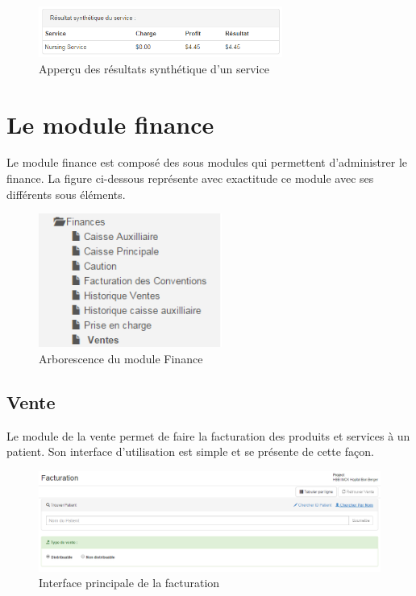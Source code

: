 \documentclass[12pt,a4paper]{report}
\begin{document}
\begin{figure}[h]
\begin{center}
\includegraphics[width=8cm]{pic/SynthetiqueService.png}
\end{center}
\caption{Apperçu des résultats synthétique d'un service}
\label{Apperçu des résultats synthétique d'un service}
\end{figure} 


\newpage

\newpage
\chapter{Le module finance}        
Le module finance est composé des sous modules qui permettent d'administrer le finance. La figure ci-dessous représente avec exactitude ce module avec ses différents sous éléments.

\begin{figure}[h]
\begin{center}
\includegraphics[width=6cm]{pic/FinanceArbo.png}
\end{center}
\caption{Arborescence du module Finance}
\label{Arborescence du module Finance}
\end{figure}


\section{Vente}
Le module de la vente permet de faire la facturation des produits et services à un patient. Son interface d'utilisation est simple et se présente de cette façon.

\begin{figure}[h]
\begin{center}
\includegraphics[width=14cm]{pic/InterfacePrinciFact.png}
\end{center}
\caption{Interface principale de la facturation}
\label{Interface principale de la facturation}
\end{figure}
\end{document}
